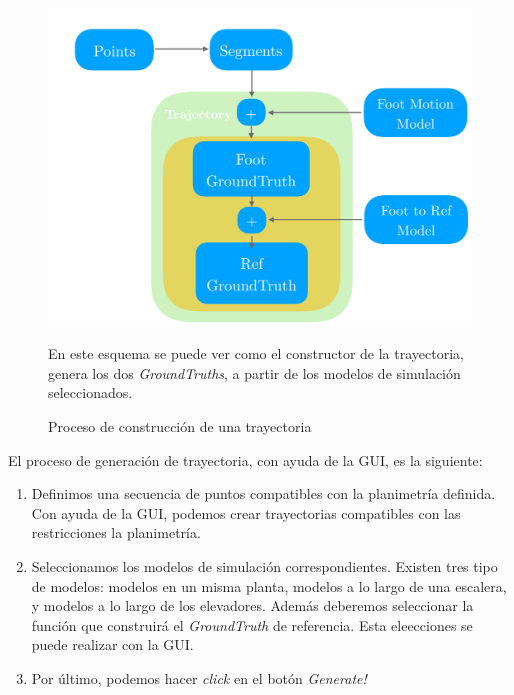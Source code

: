 \begin{figure}[ht!]
    \centering
    \includegraphics[width=0.8\columnwidth]{img/Design/2.pdf}
    \caption{Proceso de construcción de una trayectoria}
    \label{TrajectorySch}
    \footnotesize
    En este esquema se puede ver como el constructor de la trayectoria, genera los dos \emph{GroundTruths}, a partir de los modelos de simulación seleccionados. 
\end{figure}



El proceso de generación de trayectoria, con ayuda de la GUI, es la siguiente:

\begin{enumerate}
    \item Definimos una secuencia de puntos compatibles con la planimetría definida. Con ayuda de la GUI, podemos crear trayectorias compatibles con las restricciones la planimetría.
    \item Seleccionamos los modelos de simulación correspondientes. Existen tres tipo de modelos: modelos en un misma planta, modelos a lo largo de una escalera, y modelos a lo largo de los elevadores. Además deberemos seleccionar la función que construirá el \emph{GroundTruth} de referencia. Esta eleecciones se puede realizar con la GUI. 
    \item Por último, podemos hacer \emph{click} en el botón \emph{Generate!}
\end{enumerate}

